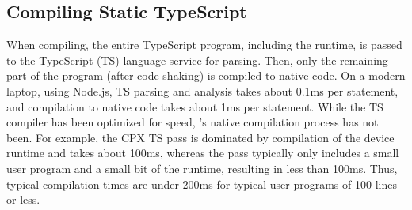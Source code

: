 


\subsection{Compiling Static TypeScript}

When compiling, the entire TypeScript program, including the runtime, is
passed to the TypeScript (TS) language service for parsing. Then, only the remaining part of the program (after code shaking) is compiled to native code.
On a modern laptop, using Node.js, TS parsing and analysis takes about 0.1ms per statement, and \MC compilation to native code takes about 1ms per statement.
While the TS compiler has been optimized for speed, \MCN's native compilation process has not been. For example, the CPX TS pass is dominated by compilation of the device runtime and takes about 100ms, whereas the \MC pass typically only includes a small user program and a small bit of the runtime, resulting in less than 100ms. Thus, typical compilation times are under 200ms for typical user programs of 100 lines or less.





